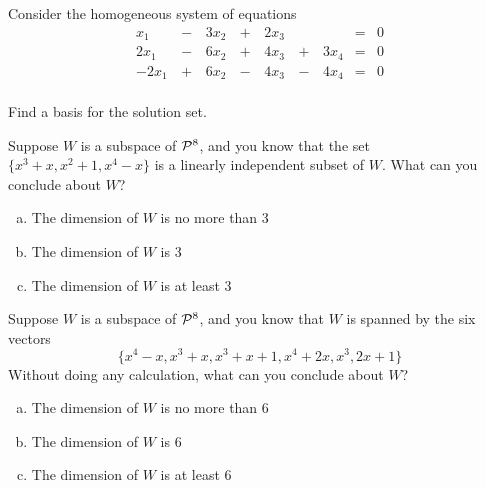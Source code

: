 \begin{applicationActivities}
\begin{activity}{10}
Consider the homogeneous system of equations 
\begin{alignat*}{5}
x_1&\,-\,&3x_2&\,+\,& 2x_3&\,\,&  &=& 0 \\
2x_1&\,-\,&6x_2&\,+\,&4x_3 &\,+\,&3 x_4 &=& 0 \\
-2x_1&\,+\,&6x_2&\,-\,&4x_3 &\,-\,&4 x_4 &=& 0 \\
\end{alignat*}

Find a basis for the solution set.
\end{activity}

\begin{activity}{5}
Suppose \(W\) is a subspace of \(\P^8\), and you know that the set \(\{ x^3+x, x^2+1, x^4-x \}\) is a linearly independent subset of \(W\).  What can you conclude about \(W\)?
\begin{enumerate}[(a)]
\item The dimension of \(W\) is no more than 3
\item The dimension of \(W\) is  3
\item The dimension of \(W\) is  at least 3
\end{enumerate}
\end{activity}

\begin{activity}{5}
Suppose \(W\) is a subspace of \(\P^8\), and you know that \(W\) is spanned by the six vectors \[\{ x^4-x,x^3+x,x^3+x+1,x^4+2x,x^3,2x+1\}\]
Without doing any calculation, what can you conclude about \(W\)?
\begin{enumerate}[(a)]
\item The dimension of \(W\) is no more than 6
\item The dimension of \(W\) is  6
\item The dimension of \(W\) is  at least 6
\end{enumerate}
\end{activity}



\end{applicationActivities}
